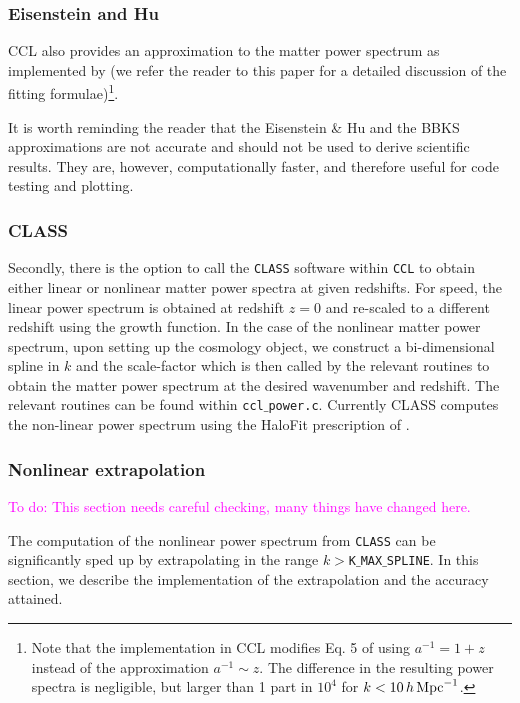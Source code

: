 \documentclass[\docopts]{\docclass}
\newcommand{\todo}[1]{\textcolor{magenta}{To do: #1}}
\begin{document}
\subsubsection{Eisenstein and Hu}
CCL also provides an approximation to the matter power spectrum as implemented by \citet{1998ApJ...496..605E} (we refer the reader to this paper for a detailed discussion of the fitting formulae)\footnote{Note that the implementation in CCL modifies Eq. 5 of \citet{1998ApJ...496..605E} using $a^{-1}=1+z$ instead of the approximation $a^{-1}\sim z$. The difference in the resulting power spectra is negligible, but larger than 1 part in $10^4$ for $k<10\,h\,{\rm Mpc}^{-1}$.}.

It is worth reminding the reader that the Eisenstein \& Hu and  the BBKS approximations are not accurate and should not be used to derive scientific results. They are, however, computationally faster, and therefore useful for code testing and plotting.

\subsubsection{CLASS}
Secondly, there is the option to call the {\tt CLASS} software \citep{class} within {\tt CCL} to obtain either linear or nonlinear matter power spectra at given redshifts. For speed, the linear power spectrum is obtained at redshift $z=0$ and re-scaled to a different redshift using the growth function. In the case of the nonlinear matter power spectrum, upon setting up the cosmology object, we construct a bi-dimensional spline in $k$ and the scale-factor which is then called by the relevant routines to obtain the matter power spectrum at the desired wavenumber and redshift. The relevant routines can be found within {\tt ccl$\_$power.c}. Currently CLASS computes the non-linear power spectrum using the HaloFit prescription of \cite{CLASS_halofit}.

\subsubsection{Nonlinear extrapolation}
\label{sec:NLextrapol}

\todo{This section needs careful checking, many things have changed here.}

The computation of the nonlinear power spectrum from {\tt CLASS} can be significantly sped up by extrapolating in the range $k>${\tt K$\_$MAX$\_$SPLINE}. In this section, we describe the implementation of the extrapolation and the accuracy attained.
\end{document}
